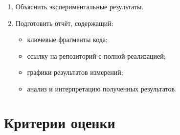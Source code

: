 \documentclass[12pt]{article}
\begin{document}
\begin{enumerate}
    \item Объяснить экспериментальные результаты.

    \item Подготовить отчёт, содержащий:
    \begin{itemize}
        \item ключевые фрагменты кода;
        \item ссылку на репозиторий с полной реализацией;
        \item графики результатов измерений;
        \item анализ и интерпретацию полученных результатов.
    \end{itemize}
\end{enumerate}

\section*{Критерии оценки}
\end{document}
